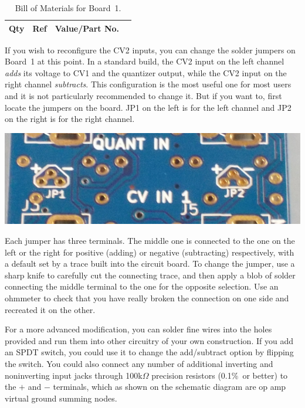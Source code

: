 \begin{table}
{\centering
{}
\vspace{\baselineskip}

\begin{tabular}{rp{1.3in}cp{3in}}
  \textbf{Qty} & \textbf{Ref} & \textbf{Value/Part No.} & \\ \hline

\end{tabular}\par}
\caption{Bill of Materials for Board~1.}\label{tab:b1bom}
\end{table}

If you wish to reconfigure the CV2 inputs, you can change the solder jumpers
on Board~1 at this point.  In a standard build, the CV2 input on the left
channel \emph{adds} its voltage to CV1 and the quantizer output, while the
CV2 input on the right channel \emph{subtracts}.  This configuration is the
most useful one for most users and it is not particularly recommended to
change it.  But if you want to, first locate the jumpers on the board.  JP1
on the left is for the left channel and JP2 on the right is for the right
channel.

\noindent\includegraphics[width=\linewidth]{jumpers.jpg}

Each jumper has three terminals.  The middle one is connected to the one on
the left or the right for positive (adding) or negative (subtracting)
respectively, with a default set by a trace built into the circuit board. 
To change the jumper, use a sharp knife to carefully cut the connecting
trace, and then apply a blob of solder connecting the middle terminal to the
one for the opposite selection.  Use an ohmmeter to check that you have
really broken the connection on one side and recreated it on the other.

For a more advanced modification, you can solder fine wires into the holes
provided and run them into other circuitry of your own construction.  If you
add an SPDT switch, you could use it to change the add/subtract option by
flipping the switch.  You could also connect any number of additional
inverting and noninverting input jacks through 100k$\Omega$ precision
resistors (0.1\%\ or better) to the $+$ and $-$ terminals, which as shown on
the schematic diagram are op amp virtual ground summing nodes.

